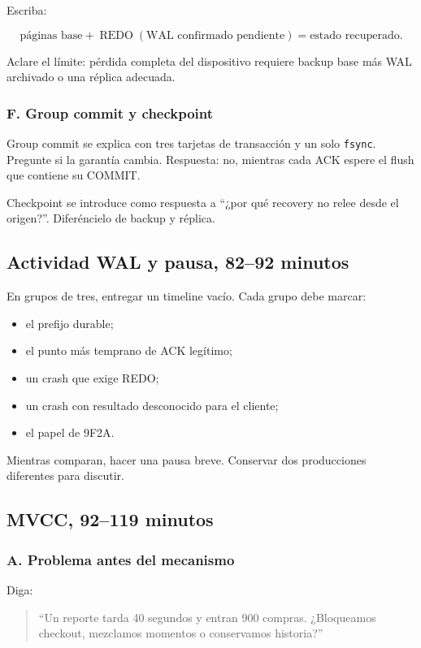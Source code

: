 \documentclass[variant=docente,cover=institutional,mode=screen]{ua-engineering-v6-article}
\begin{document}
Escriba:

\[
\text{páginas base} + \operatorname{REDO}(\text{WAL confirmado pendiente})
= \text{estado recuperado}.
\]

Aclare el límite: pérdida completa del dispositivo requiere backup base más WAL archivado o una réplica adecuada.

\subsubsection*{F. Group commit y checkpoint}

Group commit se explica con tres tarjetas de transacción y un solo \texttt{fsync}. Pregunte si la garantía cambia. Respuesta: no, mientras cada ACK espere el flush que contiene su COMMIT.

Checkpoint se introduce como respuesta a ``¿por qué recovery no relee desde el origen?''. Diferéncielo de backup y réplica.

\subsection{Actividad WAL y pausa, 82--92 minutos}

En grupos de tres, entregar un timeline vacío. Cada grupo debe marcar:

\begin{itemize}
\item el prefijo durable;
\item el punto más temprano de ACK legítimo;
\item un crash que exige REDO;
\item un crash con resultado desconocido para el cliente;
\item el papel de 9F2A.
\end{itemize}

Mientras comparan, hacer una pausa breve. Conservar dos producciones diferentes para discutir.

\subsection{MVCC, 92--119 minutos}

\subsubsection*{A. Problema antes del mecanismo}

Diga:

\begin{quote}
``Un reporte tarda 40 segundos y entran 900 compras. ¿Bloqueamos checkout, mezclamos momentos o conservamos historia?''
\end{quote}
\end{document}
